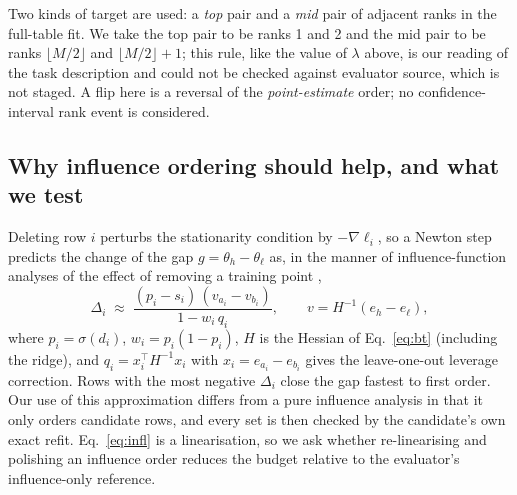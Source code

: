 \documentclass{article}
\newcommand{\hi}{h}
\newcommand{\lo}{\ell}
\begin{document}
Two kinds of target are used: a \emph{top} pair and a \emph{mid} pair of adjacent ranks in the full-table fit. We take the top pair to be ranks 1 and 2 and the mid pair to be ranks $\lfloor M/2\rfloor$ and $\lfloor M/2\rfloor+1$; this rule, like the value of $\lambda$ above, is our reading of the task description and could not be checked against evaluator source, which is not staged. A flip here is a reversal of the \emph{point-estimate} order; no confidence-interval rank event is considered.

\subsection{Why influence ordering should help, and what we test}
Deleting row $i$ perturbs the stationarity condition by $-\nabla\ell_i$, so a Newton step predicts the change of the gap $g=\theta_{\hi}-\theta_{\lo}$ as, in the manner of influence-function analyses of the effect of removing a training point \citep{https://doi.org/10.48550/arxiv.1703.04730},
\begin{equation}
\Delta_i\;\approx\;\frac{(p_i-s_i)\,(v_{a_i}-v_{b_i})}{1-w_i\,q_i},\qquad v=H^{-1}(e_{\hi}-e_{\lo}),
\label{eq:infl}
\end{equation}
where $p_i=\sigma(d_i)$, $w_i=p_i(1-p_i)$, $H$ is the Hessian of Eq.~\eqref{eq:bt} (including the ridge), and $q_i=x_i^\top H^{-1}x_i$ with $x_i=e_{a_i}-e_{b_i}$ gives the leave-one-out leverage correction. Rows with the most negative $\Delta_i$ close the gap fastest to first order. Our use of this approximation differs from a pure influence analysis in that it only orders candidate rows, and every set is then checked by the candidate's own exact refit. Eq.~\eqref{eq:infl} is a linearisation, so we ask whether re-linearising and polishing an influence order reduces the budget relative to the evaluator's influence-only reference.
\end{document}
